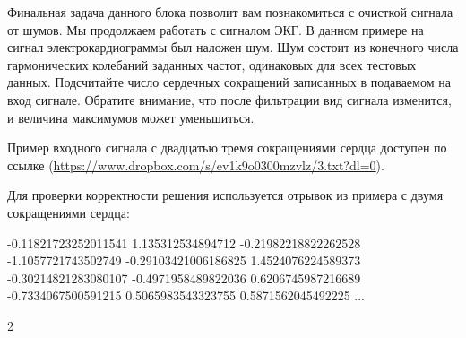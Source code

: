 
Финальная задача данного блока позволит вам познакомиться с очисткой сигнала от шумов. Мы продолжаем работать с сигналом ЭКГ. В данном примере на сигнал электрокардиограммы был наложен шум. Шум состоит из конечного числа гармонических колебаний заданных частот, одинаковых для всех тестовых данных. Подсчитайте число сердечных сокращений записанных в подаваемом на вход сигнале. Обратите внимание, что после фильтрации вид сигнала изменится, и величина максимумов может уменьшиться.

Пример входного сигнала с двадцатью тремя сокращениями сердца доступен по ссылке (\url{https://www.dropbox.com/s/ev1k9o0300mzvlz/3.txt?dl=0}).

Для проверки корректности решения используется отрывок из примера с двумя сокращениями сердца:



\begin{myverbbox}[\small]{\vinput}
    -0.11821723252011541 1.135312534894712 -0.21982218822262528 
    -1.1057721743502749 -0.29103421006186825 1.4524076224589373 
    -0.30214821283080107 -0.4971958489822036 0.6206745987216689 
    -0.7334067500591215 0.5065983543323755 0.5871562045492225
    ...
\end{myverbbox}
\begin{myverbbox}[\small]{\voutput}
   2
\end{myverbbox}

